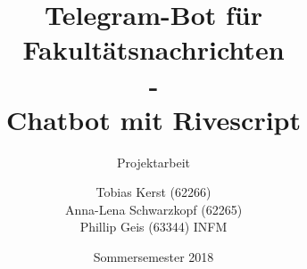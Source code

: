 \title{Telegram-Bot für Fakultätsnachrichten \\ - \\ Chatbot mit Rivescript}
\subtitle{Projektarbeit}
\author{%
	Tobias Kerst (62266) \\
  Anna-Lena Schwarzkopf (62265) \\
  Phillip Geis (63344)
  INFM
}
\date{Sommersemester 2018}
\publishers{
    \textbf{Professor:} Prof. Dr. rer. nat. Peter A. Henning
}
\maketitle

\clearpage
